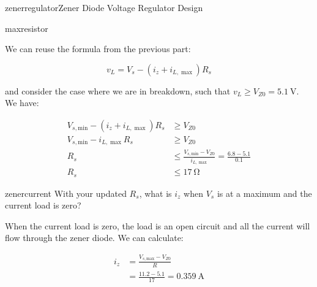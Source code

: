 \begin{mainquestion}{zenerregulator}{Zener Diode Voltage Regulator Design}
\begin{partquestion}{maxresistor}
\begin{answer}
We can reuse the formula from the previous part:

\[
v_L = V_s - (i_z + i_{L,\max}) R_s
\]

and consider the case where we are in breakdown, such that $v_L \geq V_{Z0} = \qty{5.1}{\volt}$. We have:

\begin{align*}
V_{s,\text{min}} - (i_z + i_{L,\max}) R_s &\geq V_{Z0} \\
V_{s,\text{min}} - i_{L,\max} R_s &\geq V_{Z0} \\
R_s &\leq \frac{V_{s,\text{min}} - V_{Z0}}{i_{L,\max}} = \frac{6.8 - 5.1}{0.1} \\
R_s &\leq \qty{17}{\ohm}
\end{align*}

\end{answer}
\end{partquestion}

\begin{partquestion}{zenercurrent}
{With your updated $R_s$, what is $i_z$ when $V_s$ is at a maximum and the current load is zero?}

\begin{answer}
When the current load is zero, the load is an open circuit and all the current will flow through the zener diode. We can calculate:

\begin{align*}
i_z &= \frac{V_{s,\text{max}} - V_{Z0}}{R} \\
&= \frac{11.2 - 5.1}{17} = \qty{0.359}{\ampere}
\end{align*}

\end{answer}
\end{partquestion}

\end{mainquestion}

